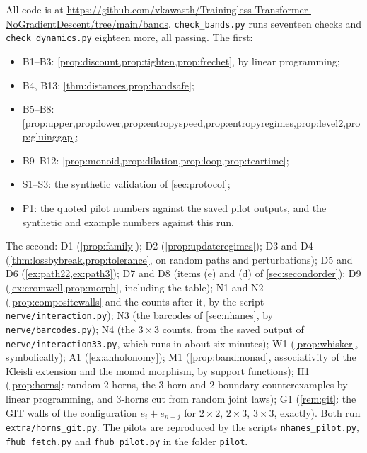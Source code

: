 \documentclass[11pt]{article}
\theoremstyle{definition}
\theoremstyle{remark}
\begin{document}
All code is at \url{https://github.com/vkawasth/Trainingless-Transformer-NoGradientDescent/tree/main/bands}. \texttt{check\_bands.py} runs seventeen checks and \texttt{check\_dynamics.py} eighteen more, all passing. The first:
\begin{itemize}[leftmargin=*,nosep]
\item B1--B3: \cref{prop:discount,prop:tighten,prop:frechet}, by linear programming;
\item B4, B13: \cref{thm:distances,prop:bandsafe};
\item B5--B8: \cref{prop:upper,prop:lower,prop:entropyspeed,prop:entropyregimes,prop:level2,prop:gluinggap};
\item B9--B12: \cref{prop:monoid,prop:dilation,prop:loop,prop:teartime};
\item S1--S3: the synthetic validation of \cref{sec:protocol};
\item P1: the quoted pilot numbers against the saved pilot outputs, and the synthetic and example numbers against this run.
\end{itemize}
The second: D1 (\cref{prop:family}); D2 (\cref{prop:updateregimes}); D3 and D4 (\cref{thm:lossbybreak,prop:tolerance}, on random paths
and perturbations); D5 and D6 (\cref{ex:path22,ex:path3}); D7 and D8 (items (e) and (d) of \cref{sec:secondorder}); D9 (\cref{ex:cromwell,prop:morph},
including the table); N1 and N2 (\cref{prop:compositewalls} and the counts after it, by the script \texttt{nerve/interaction.py}); N3 (the
barcodes of \cref{sec:nhanes}, by \texttt{nerve/barcodes.py}); N4 (the $3\times3$ counts, from the saved output of
\texttt{nerve/interaction33.py}, which runs in about six minutes); W1 (\cref{prop:whisker}, symbolically); A1 (\cref{ex:anholonomy}); M1 (\cref{prop:bandmonad}, associativity of the Kleisli extension and the monad morphism, by support functions); H1 (\cref{prop:horns}: random $2$-horns, the $3$-horn and $2$-boundary counterexamples by linear
programming, and $3$-horns cut from random joint laws); G1 (\cref{rem:git}: the GIT walls of the configuration $e_i+e_{n+j}$ for
$2\times2$, $2\times3$, $3\times3$, exactly). Both run \texttt{extra/horns\_git.py}.
The pilots are reproduced by the scripts \texttt{nhanes\_pilot.py}, \texttt{fhub\_fetch.py} and \texttt{fhub\_pilot.py} in the
folder \texttt{pilot}.
\end{document}
